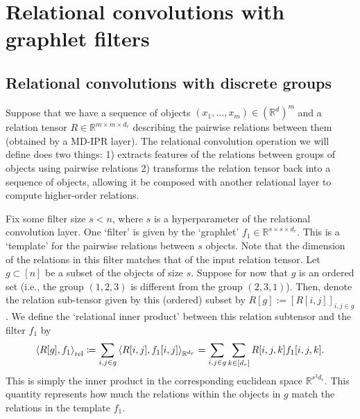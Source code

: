 \section{Relational convolutions with graphlet filters}\label{sec:relconv}

\subsection{Relational convolutions with discrete groups}
Suppose that we have a sequence of objects $(x_1, \ldots, x_m) \in (\mathbb{R}^{d})^m$ and a relation tensor $R \in \mathbb{R}^{m \times m \times d_r}$ describing the pairwise relations between them (obtained by a MD-IPR layer). The relational convolution operation we will define does two things: 1) extracts features of the relations between groups of objects using pairwise relations 2) transforms the relation tensor back into a sequence of objects, allowing it be composed with another relational layer to compute higher-order relations.

Fix some filter size $s < n$, where $s$ is a hyperparameter of the relational convolution layer. One `filter' is given by the `graphlet' $f_1 \in \mathbb{R}^{s \times s \times d_r}$. This is a `template' for the pairwise relations between $s$ objects. Note that the dimension of the relations in this filter matches that of the input relation tensor. Let $g \subset [n]$ be a subset of the objects of size $s$. Suppose for now that $g$ is an ordered set (i.e., the group $(1, 2, 3)$ is different from the group $(2, 3, 1)$). Then, denote the relation sub-tensor given by this (ordered) subset by $R[g] := [R[i,j]]_{i,j \in g}$. We define the `relational inner product' between this relation subtensor and the filter $f_1$ by
\begin{equation}
    \label{eq:relational_inner_prod_one_filt}
    \left\langle R[g], f_1 \right\rangle_\mathrm{rel} \coloneqq \sum_{i,j \in g} \left \langle R[i,j], f_1[i,j] \right\rangle_{\mathbb{R}^{d_r}} = \sum_{i,j \in g} \sum_{k \in [d_r]} R[i,j,k] f_1[i,j,k].
\end{equation}
This is simply the inner product in the corresponding euclidean space $\mathbb{R}^{s^2 d_r}$. This quantity represents how much the relations within the objects in $g$ match the relations in the template $f_1$.



